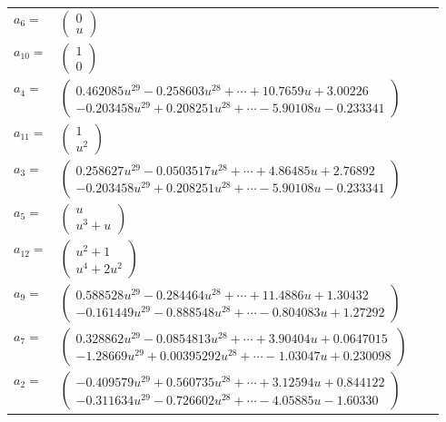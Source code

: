 \documentclass[1p]{elsarticle_modified}
\theoremstyle{definition}
\begin{document}
\begin{tabular}{m{7pt} m{180pt} m{7pt} m{180pt} }
\flushright $a_{6}=$&$\begin{pmatrix}0\\u\end{pmatrix}$ \\
\flushright $a_{10}=$&$\begin{pmatrix}1\\0\end{pmatrix}$ \\
\flushright $a_{4}=$&$\begin{pmatrix}0.462085 u^{29}-0.258603 u^{28}+\cdots+10.7659 u+3.00226\\-0.203458 u^{29}+0.208251 u^{28}+\cdots-5.90108 u-0.233341\end{pmatrix}$ \\
\flushright $a_{11}=$&$\begin{pmatrix}1\\u^2\end{pmatrix}$ \\
\flushright $a_{3}=$&$\begin{pmatrix}0.258627 u^{29}-0.0503517 u^{28}+\cdots+4.86485 u+2.76892\\-0.203458 u^{29}+0.208251 u^{28}+\cdots-5.90108 u-0.233341\end{pmatrix}$ \\
\flushright $a_{5}=$&$\begin{pmatrix}u\\u^3+u\end{pmatrix}$ \\
\flushright $a_{12}=$&$\begin{pmatrix}u^2+1\\u^4+2 u^2\end{pmatrix}$ \\
\flushright $a_{9}=$&$\begin{pmatrix}0.588528 u^{29}-0.284464 u^{28}+\cdots+11.4886 u+1.30432\\-0.161449 u^{29}-0.888548 u^{28}+\cdots-0.804083 u+1.27292\end{pmatrix}$ \\
\flushright $a_{7}=$&$\begin{pmatrix}0.328862 u^{29}-0.0854813 u^{28}+\cdots+3.90404 u+0.0647015\\-1.28669 u^{29}+0.00395292 u^{28}+\cdots-1.03047 u+0.230098\end{pmatrix}$ \\
\flushright $a_{2}=$&$\begin{pmatrix}-0.409579 u^{29}+0.560735 u^{28}+\cdots+3.12594 u+0.844122\\-0.311634 u^{29}-0.726602 u^{28}+\cdots-4.05885 u-1.60330\end{pmatrix}$ \\

\end{tabular}
\end{document}
